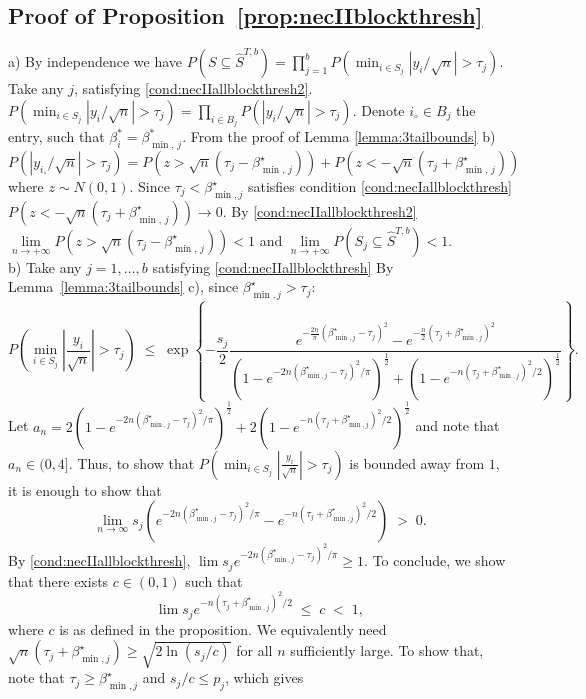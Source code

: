 \documentclass[aos]{imsart}
\theoremstyle{plain}
\begin{document}
\begin{supplement}
\subsection{Proof of Proposition~\ref{prop:necIIblockthresh}} 
a) By independence we have 
$P(S \subseteq \hat{S}^{T,b})=\prod_{j=1}^b P(\min_{i \in S_j}|y_i/\sqrt{n}| > \tau_j)$. Take any $j$, satisfying \eqref{cond:necIIallblockthresh2}. $P(\min_{i \in S_j}|y_i/\sqrt{n}| > \tau_j)=\prod_{i \in B_j} P(|y_i/\sqrt{n}| > \tau_j)$. Denote $i_{\circ}\in B_j$ the entry, such that $\beta_i^*=\beta^*_{\min,\,j}$. From the proof of Lemma \ref{lemma:3tailbounds} b) $$P(|y_{i_{\circ}}/\sqrt{n}|>\tau_j) 
    = P\left(z>\sqrt{n}\left(\tau_j-\beta_{\min,\,j}^{\star}\right)\right) + P\left(z<-\sqrt{n}\left(\tau_j+\beta_{\min,\,j}^{\star}\right)\right)$$ where $z\sim N(0,1)$. Since $\tau_j<\beta^\star_{\min,j}$ satisfies condition \eqref{cond:necIallblockthresh} $P(z<-\sqrt{n}\left(\tau_j+\beta_{\min,\,j}^{\star}\right)) \to 0$. By \eqref{cond:necIIallblockthresh2} $\underset{n \to +\infty}{\lim}P\left(z>\sqrt{n}\left(\tau_j-\beta_{\min,\,j}^{\star}\right)\right)<1$ and $\underset{n \to +\infty}{\lim}P\left(S_j \subseteq \hat{S}^{T,b} \right)<1$.\\
b)	Take any $j=1,\ldots,b$ satisfying \eqref{cond:necIIallblockthresh} By Lemma~\ref{lemma:3tailbounds} c), since $\beta^\star_{\min,j}>\tau_j$:
$$P\left(\min_{i \in S_j}|\frac{y_i}{\sqrt{n}}| > \tau_j \right)\;\leq\;\exp\left\{-\frac{s_j}{2}\frac{e^{-\tfrac{2n}{\pi}(\beta^\star_{\min,j}-\tau_j)^2}-e^{-\tfrac{n}{2}(\tau_j+\beta^\star_{\min,j})^2}}{\left(1-e^{-2n(\beta^\star_{\min,j}-\tau_j)^2/\pi}\right)^{\frac{1}{2}}+\left(1-e^{-n(\tau_j+\beta^\star_{\min,j})^2/2}\right)^{\frac{1}{2}}}\right\}. $$
Let $a_{n}=2\left(1-e^{-2n(\beta^\star_{\min,j}-\tau_j)^2/\pi}\right)^{\frac{1}{2}}+2\left(1-e^{-n(\tau_j+\beta^\star_{\min,j})^2/2}\right)^{\frac{1}{2}}$ and note that $a_n\in (0, 4]$.  Thus, to show that $P\left(\min_{i \in S_j}|\tfrac{y_i}{\sqrt{n}}| > \tau_j \right)$ is bounded away from $1$, it is enough to show that 
$$
\lim_{n\to \infty}{s_j}({e^{-2n(\beta^\star_{\min,j}-\tau_j)^2/\pi}-e^{-n(\tau_j+\beta^\star_{\min,j})^2/2}})\;>\;0.
$$
By \eqref{cond:necIIallblockthresh}, $\lim {s_j} e^{-2n(\beta^\star_{\min,j}-\tau_j)^2/\pi}\geq 1$. To conclude, we show that there exists $c\in(0,1)$ such that
$$
\lim {s_j} e^{-n(\tau_j+\beta^\star_{\min,j})^2/2}\;\leq\;c\;<\;1,
$$ 
where $c$ is as defined in the proposition. We equivalently need
$\sqrt{n}(\tau_j+\beta^\star_{\min,j})\geq\sqrt{{2\ln (s_j/c)}}$ for all $n$ sufficiently large. To show that, note that $\tau_j\geq \beta^\star_{\min,j}$ and $s_j/c\leq p_j$, which gives

\end{supplement}
\end{document}

